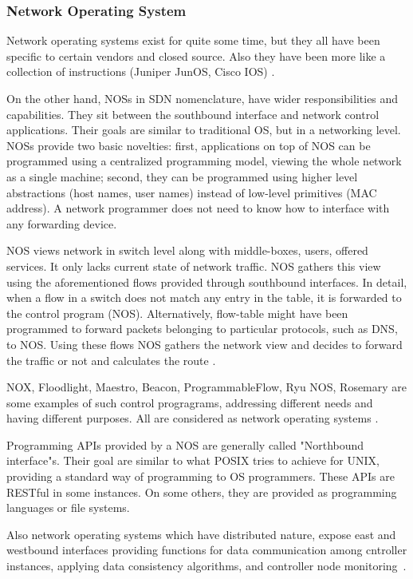 \documentclass[12pt,journal,compsoc]{IEEEtran}
\begin{document}
\subsubsection{Network Operating System}
Network operating systems exist for quite some time, but they all have been specific
 to certain vendors and closed source. Also they have been more like a collection 
of instructions (Juniper JunOS, Cisco IOS) \cite{kreutz}.

On the other hand, NOSs in SDN nomenclature, have wider responsibilities and capabilities.
 They sit between the southbound interface and network control applications.
 Their goals are similar to traditional OS, but in a networking 
level. NOSs provide two basic novelties: first, applications on top of NOS can 
be programmed using a centralized programming model, viewing the whole network as 
a single machine; second, they can be programmed using higher level
abstractions (host names, user names) instead of low-level primitives (MAC address).
 A network programmer does not need to know how to interface with any forwarding 
device. \cite{casado1}

NOS views network in switch level along with middle-boxes, users, offered services.
 It only lacks current state of network traffic. NOS gathers this view using 
the aforementioned flows provided through southbound interfaces. In detail, when a
 flow in a switch does not match any entry in the table, it is forwarded 
to the control program (NOS). Alternatively, flow-table might have been programmed 
to forward packets belonging to particular protocols, such as DNS, to NOS. Using 
these flows NOS gathers the network view and decides to forward the traffic or not
 and calculates the route \cite{gude}.

 NOX, Floodlight, Maestro, Beacon, ProgrammableFlow, Ryu NOS, Rosemary are some 
examples of such control progragrams, addressing different needs and having 
different purposes. All are considered as network operating systems \cite{kreutz}.

Programming APIs provided by a NOS are generally called "Northbound interface"s.
 Their goal are similar to what POSIX tries to achieve for UNIX, providing a 
standard way of programming to OS programmers. These APIs are RESTful in some 
instances. On some others, they are provided as programming languages or file 
systems.

Also network operating systems which have distributed nature, expose east and 
westbound interfaces providing functions for data communication among 
cntroller instances, applying data consistency algorithms, and controller node 
monitoring \cite{kreutz}.
\end{document}
